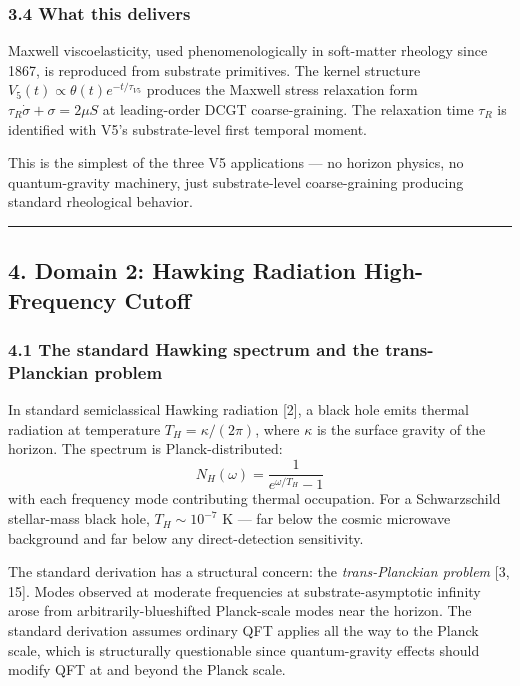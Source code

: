 \documentclass[
  11pt,
  a4paperpaper,
]{article}
\begin{document}
\subsubsection{3.4 What this delivers}\label{what-this-delivers}

Maxwell viscoelasticity, used phenomenologically in soft-matter rheology
since 1867, is reproduced from substrate primitives. The kernel
structure \(V_5(t) \propto \theta(t) e^{-t/\tau_{V5}}\) produces the
Maxwell stress relaxation form \(\tau_R \dot\sigma + \sigma = 2\mu S\)
at leading-order DCGT coarse-graining. The relaxation time \(\tau_R\) is
identified with V5's substrate-level first temporal moment.

This is the simplest of the three V5 applications --- no horizon
physics, no quantum-gravity machinery, just substrate-level
coarse-graining producing standard rheological behavior.

\begin{center}\rule{0.5\linewidth}{0.5pt}\end{center}

\subsection{4. Domain 2: Hawking Radiation High-Frequency
Cutoff}\label{domain-2-hawking-radiation-high-frequency-cutoff}

\subsubsection{4.1 The standard Hawking spectrum and the trans-Planckian
problem}\label{the-standard-hawking-spectrum-and-the-trans-planckian-problem}

In standard semiclassical Hawking radiation {[}2{]}, a black hole emits
thermal radiation at temperature \(T_H = \kappa/(2\pi)\), where
\(\kappa\) is the surface gravity of the horizon. The spectrum is
Planck-distributed: \[N_H(\omega) = \frac{1}{e^{\omega/T_H} - 1}\] with
each frequency mode contributing thermal occupation. For a Schwarzschild
stellar-mass black hole, \(T_H \sim 10^{-7}\) K --- far below the cosmic
microwave background and far below any direct-detection sensitivity.

The standard derivation has a structural concern: the
\emph{trans-Planckian problem} {[}3, 15{]}. Modes observed at moderate
frequencies at substrate-asymptotic infinity arose from
arbitrarily-blueshifted Planck-scale modes near the horizon. The
standard derivation assumes ordinary QFT applies all the way to the
Planck scale, which is structurally questionable since quantum-gravity
effects should modify QFT at and beyond the Planck scale.
\end{document}
